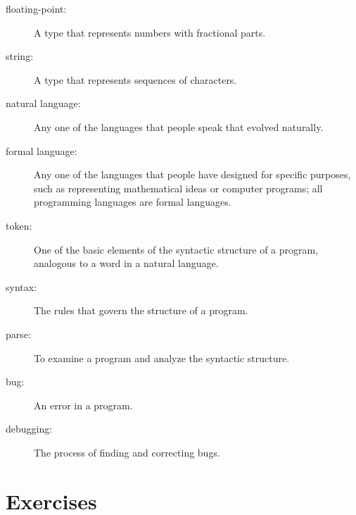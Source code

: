 \documentclass[10pt]{book}
\begin{document}
\begin{description}
\item[floating-point:] A type that represents numbers with fractional
parts.

\item[string:] A type that represents sequences of characters.

\item[natural language:]  Any one of the languages that people speak that
evolved naturally.

\item[formal language:]  Any one of the languages that people have designed
for specific purposes, such as representing mathematical ideas or
computer programs; all programming languages are formal languages.

\item[token:]  One of the basic elements of the syntactic structure of
a program, analogous to a word in a natural language.

\item[syntax:] The rules that govern the structure of a program.

\item[parse:] To examine a program and analyze the syntactic structure.

\item[bug:] An error in a program.

\item[debugging:] The process of finding and correcting bugs.

\end{description}


\section{Exercises}
\end{document}
